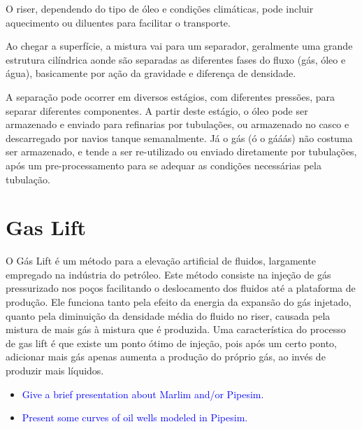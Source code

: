 O riser, dependendo do tipo de óleo e condições climáticas, pode incluir aquecimento ou diluentes para facilitar o transporte.
%


Ao chegar a superfície, a mistura vai para um separador, geralmente uma grande estrutura cilíndrica aonde são separadas as diferentes fases do fluxo (gás, óleo e água), basicamente por ação da gravidade e diferença de densidade.
%


A separação pode ocorrer em diversos estágios, com diferentes pressões, para separar diferentes componentes.
%
A partir deste estágio, o óleo pode ser armazenado e enviado para refinarias por tubulações, ou armazenado no casco e descarregado por navios tanque semanalmente.
%
Já o gás (ó o gááás) não costuma ser armazenado, e tende a ser re-utilizado ou enviado diretamente por tubulações, após um pre-processamento para se adequar as condições necessárias pela tubulação.
%
 

\section{Gas Lift}
O Gás Lift é um método para a elevação artificial de fluidos, largamente empregado na indústria do petróleo.
%
Este método consiste na injeção de gás pressurizado nos poços facilitando o deslocamento dos fluidos até a plataforma de produção. 
%
Ele funciona tanto pela efeito da energia da expansão do gás injetado, quanto pela diminuição da densidade média do fluido no riser, causada pela mistura de mais gás à mistura que é produzida.
%
Uma característica do processo de gas lift é que existe um ponto ótimo de injeção, pois após um certo ponto, adicionar mais gás apenas aumenta a produção do próprio gás, ao invés de produzir mais líquidos.





\begin{itemize}

\item \textcolor{blue}{Give a brief presentation about Marlim and/or Pipesim.}

\item \textcolor{blue}{Present some curves of oil wells modeled in Pipesim.}


\end{itemize}
